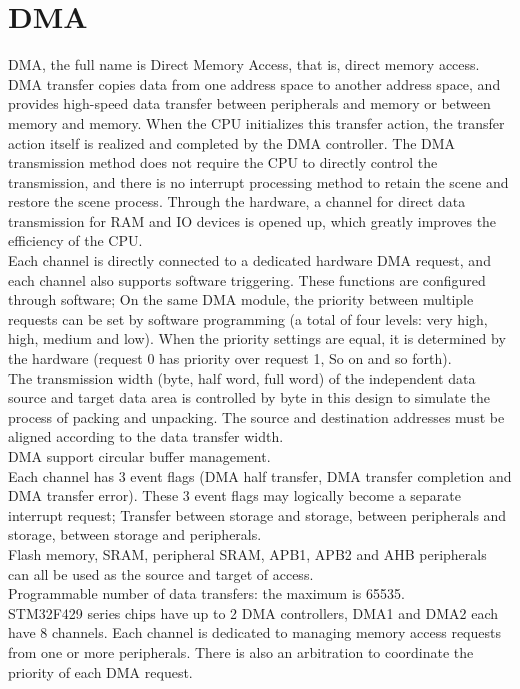 \section{DMA}
\label{sec:DMA}
DMA, the full name is Direct Memory Access, that is, direct memory access.
\\
DMA transfer copies data from one address space to another address space, and provides high-speed data transfer between peripherals and memory or between memory and memory. When the CPU initializes this transfer action, the transfer action itself is realized and completed by the DMA controller. The DMA transmission method does not require the CPU to directly control the transmission, and there is no interrupt processing method to retain the scene and restore the scene process. Through the hardware, a channel for direct data transmission for RAM and IO devices is opened up, which greatly improves the efficiency of the CPU.
\\
Each channel is directly connected to a dedicated hardware DMA request, and each channel also supports software triggering. These functions are configured through software;
On the same DMA module, the priority between multiple requests can be set by software programming (a total of four levels: very high, high, medium and low). When the priority settings are equal, it is determined by the hardware (request 0 has priority over request 1, So on and so forth).
\\
The transmission width (byte, half word, full word) of the independent data source and target data area is controlled by byte in this design to simulate the process of packing and unpacking. The source and destination addresses must be aligned according to the data transfer width.
\\
DMA support circular buffer management.
\\
Each channel has 3 event flags (DMA half transfer, DMA transfer completion and DMA transfer error). These 3 event flags may logically become a separate interrupt request;
Transfer between storage and storage, between peripherals and storage, between storage and peripherals.
\\
Flash memory, SRAM, peripheral SRAM, APB1, APB2 and AHB peripherals can all be used as the source and target of access.
\\
Programmable number of data transfers: the maximum is 65535.
\\
STM32F429 series chips have up to 2 DMA controllers, DMA1 and DMA2 each have 8 channels. Each channel is dedicated to managing memory access requests from one or more peripherals. There is also an arbitration to coordinate the priority of each DMA request.
